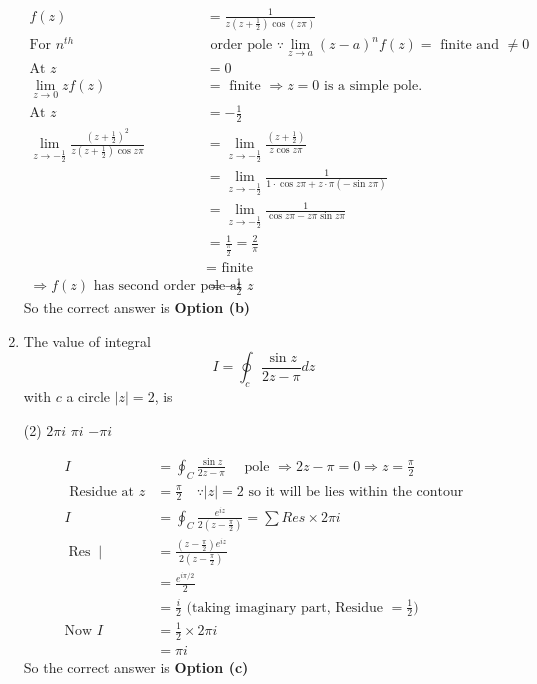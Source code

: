 \begin{enumerate}
\begin{answer}
	\begin{align*}
	f(z)&=\frac{1}{z\left(z+\frac{1}{2}\right) \cos (z \pi)}\\
	\text{For }n^{t h}&\text{ order pole $\because \lim _{z \rightarrow a}(z-a)^{n} f(z)=$ finite and $\neq 0$}\\
	\text{At }z&=0\\
	\lim _{z \rightarrow 0} z f(z)&=\text{ finite }\Rightarrow z=0\text{ is a simple pole.}\\
	\text{At }z&=-\frac{1}{2}\\
	\lim _{z \rightarrow-\frac{1}{2}} \frac{\left(z+\frac{1}{2}\right)^{2}}{z\left(z+\frac{1}{2}\right) \cos z \pi}&=\lim _{z \rightarrow-\frac{1}{2}} \frac{\left(z+\frac{1}{2}\right)}{z \cos z \pi}\\&=\lim _{z \rightarrow-\frac{1}{2}} \frac{1}{1 \cdot \cos z \pi+z \cdot \pi(-\sin z \pi)}\\
	&=\lim _{z \rightarrow-\frac{1}{2}} \frac{1}{\cos z \pi-z \pi \sin z \pi}\\&=\frac{1}{\frac{\pi}{2}}=\frac{2}{\pi}\\&=\text{ finite}\\
	\Rightarrow f(z)\text{ has second order pole at }z&=-\frac{1}{2}
	\end{align*}
	So the correct answer is \textbf{Option (b)}
\end{answer}
	\item The value of integral
$$
I=\oint_{c} \frac{\sin z}{2 z-\pi} d z
$$
with $c$ a circle $|z|=2$, is
\begin{tasks}(2)
	\task[\textbf{b.}]$2 \pi i$
	\task[\textbf{c.}]$\pi i$
	\task[\textbf{d.}] $-\pi i$
\end{tasks}
\begin{answer}
	\begin{align*}
	I&=\oint_{C} \frac{\sin z}{2 z-\pi} \quad\text{ pole }\Rightarrow 2 z-\pi=0 \Rightarrow z=\frac{\pi}{2}\\
	\text{	Residue at }z&=\frac{\pi}{2} \quad \because|z|=2\text{ so it will be lies within the contour}\\
	I&=\oint_{C} \frac{e^{i z}}{2\left(z-\frac{\pi}{2}\right)}=\sum Res \times 2 \pi i\\
	\operatorname{Res} \mid&=\frac{\left(z-\frac{\pi}{2}\right) e^{i z}}{2\left(z-\frac{\pi}{2}\right)}\\&=\frac{e^{i \pi / 2}}{2}\\&=\frac{i}{2}\text{ (taking imaginary part, Residue $=\frac{1}{2}$})\\
	\text{Now }I&=\frac{1}{2} \times 2 \pi i\\&=\pi i
	\end{align*}
	So the correct answer is \textbf{Option (c)}
\end{answer}
\end{enumerate}

